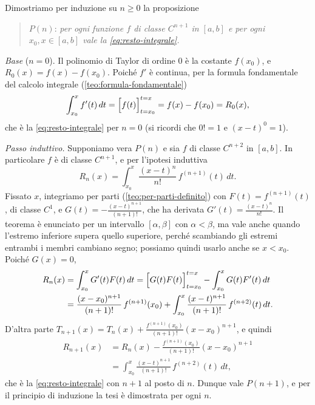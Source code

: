 \begin{dimostrazione}
Dimostriamo per induzione su $n\ge0$ la proposizione
\begin{quote}
$P(n)$: \emph{per ogni funzione $f$ di classe $C^{n+1}$ in $[a,b]$ e per ogni
$x_{0},x\in[a,b]$ vale la \eqref{eq:resto-integrale}.}
\end{quote}

\emph{Base} ($n=0$). Il polinomio di Taylor di ordine $0$ è la costante $f(x_{0})$, e
$R_{0}(x)=f(x)-f(x_{0})$. Poiché $f'$ è continua, per la formula fondamentale del calcolo
integrale (\cref{teo:formula-fondamentale})
\[
  \int_{x_{0}}^{x}f'(t)\,dt=\Bigl[f(t)\Bigr]_{t=x_{0}}^{t=x}=f(x)-f(x_{0})=R_{0}(x) ,
\]
che è la \eqref{eq:resto-integrale} per $n=0$ (si ricordi che $0!=1$ e $(x-t)^{0}=1$).

\emph{Passo induttivo.} Supponiamo vera $P(n)$ e sia $f$ di classe $C^{n+2}$ in $[a,b]$. In
particolare $f$ è di classe $C^{n+1}$, e per l'ipotesi induttiva
\[
  R_{n}(x)=\int_{x_{0}}^{x}\frac{(x-t)^{n}}{n!}\,f^{(n+1)}(t)\,dt .
\]
Fissato $x$, integriamo per parti (\cref{teo:per-parti-definito}) con
$F(t)=f^{(n+1)}(t)$, di classe $C^{1}$, e $G(t)=-\frac{(x-t)^{n+1}}{(n+1)!}$, che ha derivata
$G'(t)=\frac{(x-t)^{n}}{n!}$. Il teorema è enunciato per un intervallo $[\alpha,\beta]$ con $\alpha<\beta$, ma
vale anche quando l'estremo inferiore supera quello superiore, perché scambiando gli
estremi entrambi i membri cambiano segno; possiamo quindi usarlo anche se $x<x_{0}$.
Poiché $G(x)=0$,
\begin{align*}
  R_{n}(x)&=\int_{x_{0}}^{x}G'(t)F(t)\,dt
  =\Bigl[G(t)F(t)\Bigr]_{t=x_{0}}^{t=x}-\int_{x_{0}}^{x}G(t)F'(t)\,dt\\
  &=\frac{(x-x_{0})^{n+1}}{(n+1)!}\,f^{(n+1)}(x_{0})
  +\int_{x_{0}}^{x}\frac{(x-t)^{n+1}}{(n+1)!}\,f^{(n+2)}(t)\,dt .
\end{align*}
D'altra parte $T_{n+1}(x)=T_{n}(x)+\frac{f^{(n+1)}(x_{0})}{(n+1)!}(x-x_{0})^{n+1}$, e quindi
\[
\begin{aligned}
  R_{n+1}(x)&=R_{n}(x)-\frac{f^{(n+1)}(x_{0})}{(n+1)!}(x-x_{0})^{n+1}\\
  &=\int_{x_{0}}^{x}\frac{(x-t)^{n+1}}{(n+1)!}\,f^{(n+2)}(t)\,dt ,
\end{aligned}
\]
che è la \eqref{eq:resto-integrale} con $n+1$ al posto di $n$. Dunque vale $P(n+1)$, e per il
principio di induzione la tesi è dimostrata per ogni $n$.
\end{dimostrazione}

